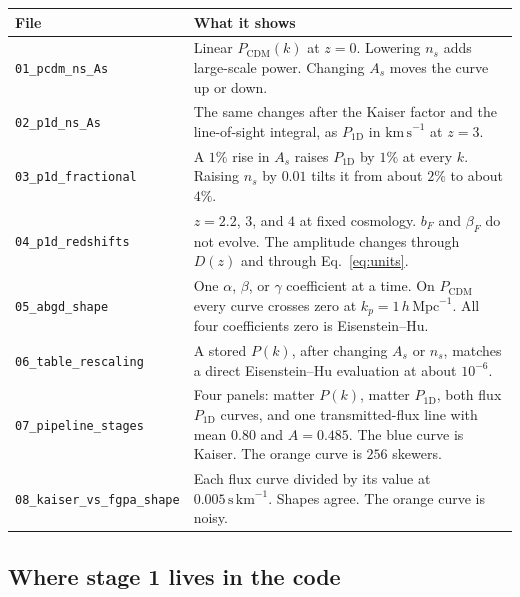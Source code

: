 \documentclass[11pt]{article}
\begin{document}
\begin{center}
\small
\begin{tabular}{@{}lp{}@{}}
\toprule
File & What it shows \\
\midrule
\texttt{01\_pcdm\_ns\_As} &
Linear $P_\mathrm{CDM}(k)$ at $z=0$. Lowering $n_s$ adds large-scale power. Changing $A_s$ moves the curve up or down. \\
\texttt{02\_p1d\_ns\_As} &
The same changes after the Kaiser factor and the line-of-sight integral, as $P_{1\mathrm{D}}$ in $\mathrm{km\,s}^{-1}$ at $z=3$. \\
\texttt{03\_p1d\_fractional} &
A $1\%$ rise in $A_s$ raises $P_{1\mathrm{D}}$ by $1\%$ at every $k$. Raising $n_s$ by $0.01$ tilts it from about $2\%$ to about $4\%$. \\
\texttt{04\_p1d\_redshifts} &
$z=2.2$, $3$, and $4$ at fixed cosmology. $b_F$ and $\beta_F$ do not evolve. The amplitude changes through $D(z)$ and through Eq.~\eqref{eq:units}. \\
\texttt{05\_abgd\_shape} &
One $\alpha$, $\beta$, or $\gamma$ coefficient at a time. On $P_\mathrm{CDM}$ every curve crosses zero at $k_p=1\,h\,\mathrm{Mpc}^{-1}$. All four coefficients zero is Eisenstein--Hu. \\
\texttt{06\_table\_rescaling} &
A stored $P(k)$, after changing $A_s$ or $n_s$, matches a direct Eisenstein--Hu evaluation at about $10^{-6}$. \\
\texttt{07\_pipeline\_stages} &
Four panels: matter $P(k)$, matter $P_{1\mathrm{D}}$, both flux $P_{1\mathrm{D}}$ curves, and one transmitted-flux line with mean $0.80$ and $A=0.485$. The blue curve is Kaiser. The orange curve is $256$ skewers. \\
\texttt{08\_kaiser\_vs\_fgpa\_shape} &
Each flux curve divided by its value at $0.005\,\mathrm{s\,km}^{-1}$. Shapes agree. The orange curve is noisy. \\
\bottomrule
\end{tabular}
\end{center}

\subsection{Where stage 1 lives in the code}
\end{document}
